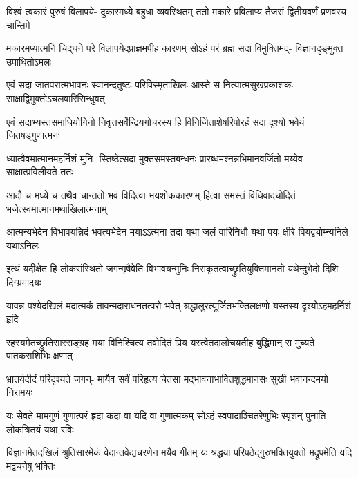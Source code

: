 \fourlineindentedshloka
{विश्वं त्वकारं पुरुषं विलापये-}
{दुकारमध्ये बहुधा व्यवस्थितम्}
{ततो मकारे प्रविलाप्य तैजसं}
{द्वितीयवर्णं प्रणवस्य चान्तिमे} %

\fourlineindentedshloka
{मकारमप्यात्मनि चिद्घने परे}
{विलापयेद्प्राज्ञमपीह कारणम्}
{सोऽहं परं ब्रह्म सदा विमुक्तिमद्-}
{विज्ञानदृङ्मुक्त उपाधितोऽमलः} %

\fourlineindentedshloka
{एवं सदा जातपरात्मभावनः}
{स्वानन्दतुष्टः परिविस्मृताखिलः}
{आस्ते स नित्यात्मसुखप्रकाशकः}
{साक्षाद्विमुक्तोऽचलवारिसिन्धुवत्} %

\fourlineindentedshloka
{एवं सदाभ्यस्तसमाधियोगिनो}
{निवृत्तसर्वेन्द्रियगोचरस्य हि}
{विनिर्जिताशेषरिपोरहं सदा}
{दृश्यो भवेयं जितषड्गुणात्मनः} %

\fourlineindentedshloka
{ध्यात्वैवमात्मानमहर्निशं मुनि-}
{स्तिष्ठेत्सदा मुक्तसमस्तबन्धनः}
{प्रारब्धमश्नन्नभिमानवर्जितो}
{मय्येव साक्षात्प्रविलीयते ततः} %

\fourlineindentedshloka
{आदौ च मध्ये च तथैव चान्ततो}
{भवं विदित्वा भयशोककारणम्}
{हित्वा समस्तं विधिवादचोदितं}
{भजेत्स्वमात्मानमथाखिलात्मनाम्} %

\fourlineindentedshloka
{आत्मन्यभेदेन विभावयन्निदं}
{भवत्यभेदेन मयाऽऽत्मना तदा}
{यथा जलं वारिनिधौ यथा पयः}
{क्षीरे वियद्व्योम्न्यनिले यथाऽनिलः} %

\fourlineindentedshloka
{इत्थं यदीक्षेत हि लोकसंस्थितो}
{जगन्मृषैवेति विभावयन्मुनिः}
{निराकृतत्वाच्छ्रुतियुक्तिमानतो}
{यथेन्दुभेदो दिशि दिग्भ्रमादयः} %

\fourlineindentedshloka
{यावन्न पश्येदखिलं मदात्मकं}
{तावन्मदाराधनतत्परो भवेत्}
{श्रद्धालुरत्यूर्जितभक्तिलक्षणो}
{यस्तस्य दृश्योऽहमहर्निशं हृदि} %

\fourlineindentedshloka
{रहस्यमेतच्छ्रुतिसारसङ्ग्रहं}
{मया विनिश्चित्य तवोदितं प्रिय}
{यस्त्वेतदालोचयतीह बुद्धिमान्}
{स मुच्यते पातकराशिभिः क्षणात्} %

\fourlineindentedshloka
{भ्रातर्यदीदं परिदृश्यते जगन्-}
{मायैव सर्वं परिहृत्य चेतसा}
{मद्भावनाभावितशुद्धमानसः}
{सुखी भवानन्दमयो निरामयः} %

\fourlineindentedshloka
{यः सेवते मामगुणं गुणात्परं}
{हृदा कदा वा यदि वा गुणात्मकम्}
{सोऽहं स्वपादाञ्चितरेणुभिः स्पृशन्}
{पुनाति लोकत्रितयं यथा रविः} %

\fourlineindentedshloka
{विज्ञानमेतदखिलं श्रुतिसारमेकं}
{वेदान्तवेद्यचरणेन मयैव गीतम्}
{यः श्रद्धया परिपठेद्गुरुभक्तियुक्तो}
{मद्रूपमेति यदि मद्वचनेषु भक्तिः} %




